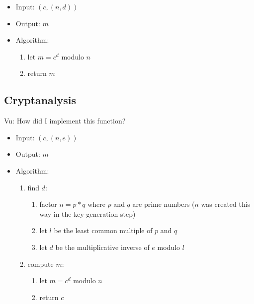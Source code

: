 \begin{itemize}
\item Input: $(c, (n, d))$
\item Output: $m$
\item Algorithm:
  \begin{enumerate}
  \item let $m = c^d$ modulo $n$
  \item return $m$
  \end{enumerate}
\end{itemize}


\subsection{Cryptanalysis}

Vu:
How did I implement this function?

\begin{itemize}
\item Input: $(c, (n, e))$
\item Output: $m$
\item Algorithm:
  \begin{enumerate}
  \item find $d$:
    \begin{enumerate}
    \item factor $n = p * q$ where
      $p$ and $q$ are prime numbers
      ($n$ was created this way in the key-generation step)
    \item let $l$ be the least common multiple of
      $p$ and $q$
    \item let $d$ be the multiplicative inverse of $e$
      modulo $l$
    \end{enumerate}
  \item compute $m$:
    \begin{enumerate}
    \item let $m = c^d$ modulo $n$
    \item return $c$
    \end{enumerate}
  \end{enumerate}
\end{itemize}
